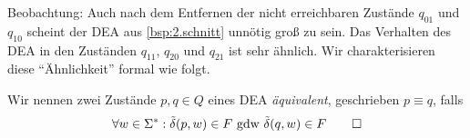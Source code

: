 %         
%
%

\medskip

Beobachtung: Auch nach dem Entfernen der nicht erreichbaren Zustände $q_{01}$ und $q_{10}$ scheint der \acs*{DEA} aus \autoref{bsp:2.schnitt} unnötig groß zu sein. Das Verhalten des \acs*{DEA} in den Zuständen $q_{11}$, $q_{20}$ und $q_{21}$ ist sehr ähnlich. 
Wir charakterisieren diese "`Ähnlichkeit"' formal wie folgt.

\begin{Def}[name={[Äquivalenz von \acs*{DEA}-Zuständen]}] %
  Wir nennen zwei Zustände $p,q\in Q$ eines \ac{DEA} \emph{äquivalent}, geschrieben $p\equiv q$, falls
  \begin{displaymath}
  \forall w\in\Sigma^*: \tilde\delta(p,w)\in F \text{ gdw } \tilde\delta(q,w)\in F
  \qedhere
  \end{displaymath}
\end{Def}

